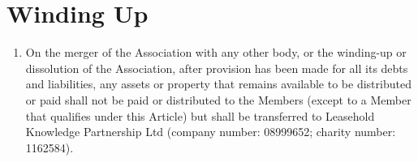 \documentclass[10pt]{mk-articles-of-association}
\newcommand{\mysection}[1]{
  \end{enumerate}
  \section*{#1}
  \begin{enumerate}[resume]
}
\begin{document}
\begin{enumerate}
\mysection{Winding Up}

\item On the merger of the Association with any other body, or the
  winding-up or dissolution of the Association, after provision has
  been made for all its debts and liabilities, any assets or property
  that remains available to be distributed or paid shall not be paid
  or distributed to the Members (except to a Member that qualifies
  under this Article) but shall be transferred to Leasehold Knowledge
  Partnership Ltd (company number: 08999652; charity number: 1162584).
\end{enumerate}
\end{document}
